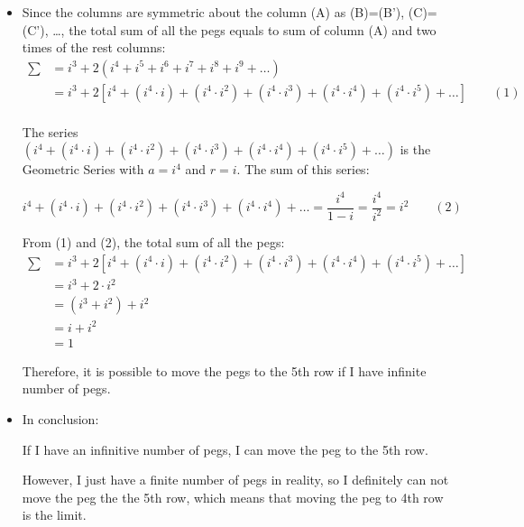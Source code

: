 \documentclass[12pt]{article}
\begin{document}
\begin{itemize}
    
    
    \item Since the columns are symmetric about the column (A) as (B)=(B'), (C)=(C'), \dots, the total sum of all the pegs equals to sum of column (A) and two times of the rest columns:
    \begin{align*}
        \sum &= i^3+ 2\left(i^4+ i^5+ i^6+ i^7+ i^8+ i^9+ \dots \right)\\
        &= i^3+ 2\left[i^4+ \left(i^4\cdot i\right)+ \left(i^4\cdot i^2\right)+ \left(i^4\cdot i^3\right)+ \left(i^4\cdot i^4\right)+ \left(i^4\cdot i^5\right)+ \dots \right]
        \qquad (1)\\
    \end{align*}
    
    The series $\left(i^4+ \left(i^4\cdot i\right)+ \left(i^4\cdot i^2\right)+ \left(i^4\cdot i^3\right)+ \left(i^4\cdot i^4\right)+ \left(i^4\cdot i^5\right)+ \dots\right) $ is the Geometric Series with $a=i^4$ and $r=i$. The sum of this series:
    
    $$ i^4+ \left(i^4\cdot i\right)+ \left(i^4\cdot i^2\right)+ \left(i^4\cdot i^3\right)+ \left(i^4\cdot i^4\right)+ \dots =\frac{i^4}{1-i} =\frac{i^4}{i^2} =i^2 \qquad (2)$$
    
    From (1) and (2), the total sum of all the pegs:
    \begin{align*}
        \sum &= i^3+ 2\left[i^4+ \left(i^4\cdot i\right)+ \left(i^4\cdot i^2\right)+ \left(i^4\cdot i^3\right)+ \left(i^4\cdot i^4\right)+ \left(i^4\cdot i^5\right)+ \dots \right] \\
        &= i^3+ 2\cdot i^2\\
        &= \left(i^3+ i^2\right) + i^2\\
        &= i+ i^2\\
        &= 1
    \end{align*}
    
    Therefore, it is possible to move the pegs to the 5th row if I have infinite number of pegs.
    
    
    \item In conclusion: \par
    If I have an infinitive number of pegs, I can move the peg to the 5th row. \par
    However, I just have a finite number of pegs in reality, so I definitely can not move the peg the the 5th row, which means that moving the peg to 4th row is the limit.
    
\end{itemize}    
    
    

    
\end{document}
